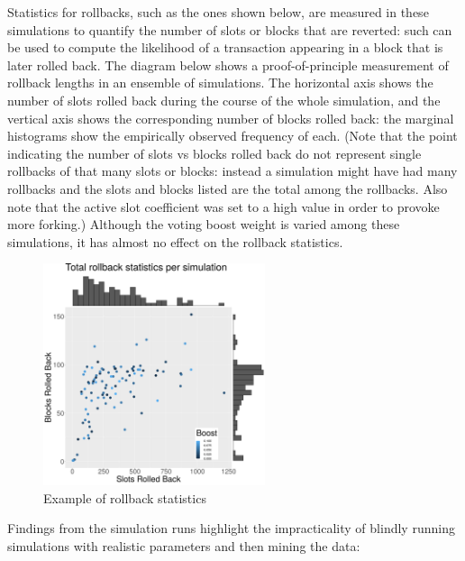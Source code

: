\documentclass[10pt]{article}
\begin{document}
Statistics for rollbacks, such as the ones shown below, are measured in
these simulations to quantify the number of slots or blocks that are
reverted: such can be used to compute the likelihood of a transaction
appearing in a block that is later rolled back. The diagram below shows
a proof-of-principle measurement of rollback lengths in an ensemble of
simulations. The horizontal axis shows the number of slots rolled back
during the course of the whole simulation, and the vertical axis shows
the corresponding number of blocks rolled back: the marginal histograms
show the empirically observed frequency of each. (Note that the point
indicating the number of slots vs blocks rolled back do not represent
single rollbacks of that many slots or blocks: instead a simulation
might have had many rollbacks and the slots and blocks listed are the
total among the rollbacks. Also note that the active slot coefficient
was set to a high value in order to provoke more forking.) Although the
voting boost weight is varied among these simulations, it has almost no
effect on the rollback statistics.

\begin{figure}
\centering
\includegraphics[width=0.58\textwidth]{../diagrams/sim-expts/rollbacks.png}
\caption{Example of rollback statistics}
\end{figure}

Findings from the simulation runs highlight the impracticality of
blindly running simulations with realistic parameters and then mining
the data:
\end{document}

